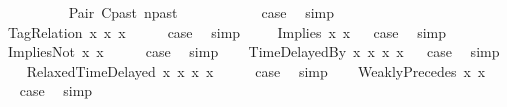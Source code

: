 \begin{isabellebody}
\ \ \ \ \ \ \ \ \isamarkupfalse%
\ {\isacharparenleft}Pair\ C\isactrlsub p\isactrlsub a\isactrlsub s\isactrlsub t\ n\isactrlsub p\isactrlsub a\isactrlsub s\isactrlsub t{\isacharparenright}\isanewline
\ \ \ \ \ \ \ \ \isamarkupfalse%
\ \isamarkupfalse%
\ {\isacharquery}case\ \isamarkupfalse%
\ simp\isanewline
\ \ \ \ \ \ \isamarkupfalse%
\isanewline
\ \ \ \ \isamarkupfalse%
\isanewline
\ \ \isamarkupfalse%
\isanewline
{}\isamarkupfalse%
\isanewline
{}\isamarkupfalse%
\ {\isacharparenleft}TagRelation\ x{}\ x{}\ x{}{\isacharparenright}\isanewline
\ \ \isamarkupfalse%
\ \isamarkupfalse%
\ {\isacharquery}case\ \isamarkupfalse%
\ simp\ \isanewline
{}\isamarkupfalse%
\isanewline
\ \ \isamarkupfalse%
\ {\isacharparenleft}Implies\ x{}\ x{}{\isacharparenright}\isanewline
{}\isamarkupfalse%
\ \isamarkupfalse%
\ {\isacharquery}case\ \isamarkupfalse%
\ simp\ \isanewline
{}\isamarkupfalse%
\isanewline
\ \ \isamarkupfalse%
\ {\isacharparenleft}ImpliesNot\ x{}\ x{}{\isacharparenright}\isanewline
\ \ \isamarkupfalse%
\ \isamarkupfalse%
\ {\isacharquery}case\ \isamarkupfalse%
\ simp\isanewline
{}\isamarkupfalse%
\isanewline
\ \ \isamarkupfalse%
\ {\isacharparenleft}TimeDelayedBy\ x{}\ x{}\ x{}\ x{}{\isacharparenright}\isanewline
{}\isamarkupfalse%
\ \isamarkupfalse%
\ {\isacharquery}case\ \isamarkupfalse%
\ simp\isanewline
{}\isamarkupfalse%
\isanewline
\ \ \isamarkupfalse%
\ {\isacharparenleft}RelaxedTimeDelayed\ x{}\ x{}\ x{}\ x{}{\isacharparenright}\isanewline
\ \ \isamarkupfalse%
\ \isamarkupfalse%
\ {\isacharquery}case\ \isamarkupfalse%
\ simp\isanewline
{}\isamarkupfalse%
\isanewline
\ \ \isamarkupfalse%
\ {\isacharparenleft}WeaklyPrecedes\ x{}\ x{}{\isacharparenright}\isanewline
\ \ \isamarkupfalse%
\ \isamarkupfalse%
\ {\isacharquery}case\ \isamarkupfalse%
\ simp\isanewline
{}\isamarkupfalse%

\end{isabellebody}
